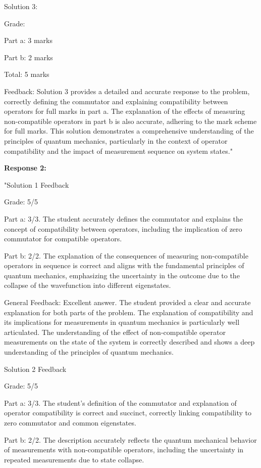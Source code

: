 \documentclass[a4paper,11pt]{article}
\begin{document}
Solution 3:

Grade:

Part a: 3 marks

Part b: 2 marks

Total: 5 marks

Feedback:
Solution 3 provides a detailed and accurate response to the problem, correctly defining the commutator and explaining compatibility between operators for full marks in part a. The explanation of the effects of measuring non-compatible operators in part b is also accurate, adhering to the mark scheme for full marks. This solution demonstrates a comprehensive understanding of the principles of quantum mechanics, particularly in the context of operator compatibility and the impact of measurement sequence on system states."

\textbf{Response 2:}

"Solution 1 Feedback

Grade: 5/5

Part a: 3/3. The student accurately defines the commutator and explains the concept of compatibility between operators, including the implication of zero commutator for compatible operators.

Part b: 2/2. The explanation of the consequences of measuring non-compatible operators in sequence is correct and aligns with the fundamental principles of quantum mechanics, emphasizing the uncertainty in the outcome due to the collapse of the wavefunction into different eigenstates.

General Feedback: Excellent answer. The student provided a clear and accurate explanation for both parts of the problem. The explanation of compatibility and its implications for measurements in quantum mechanics is particularly well articulated. The understanding of the effect of non-compatible operator measurements on the state of the system is correctly described and shows a deep understanding of the principles of quantum mechanics.

Solution 2 Feedback

Grade: 5/5

Part a: 3/3. The student's definition of the commutator and explanation of operator compatibility is correct and succinct, correctly linking compatibility to zero commutator and common eigenstates.

Part b: 2/2. The description accurately reflects the quantum mechanical behavior of measurements with non-compatible operators, including the uncertainty in repeated measurements due to state collapse.
\end{document}
